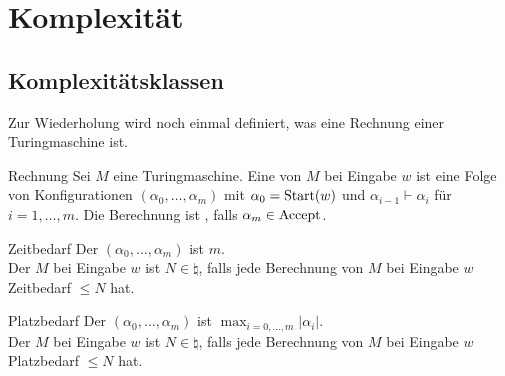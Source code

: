 \chapter{%
    Komplexität%
}

\section{%
    Komplexitätsklassen%
}

\begin{Bem}
    Zur Wiederholung wird noch einmal definiert, was eine Rechnung einer Turingmaschine ist.
\end{Bem}

\begin{Def}{Rechnung}
    Sei $M$ eine Turingmaschine.
    Eine  von $M$ bei Eingabe $w$ ist eine Folge von Konfigurationen
    $(\alpha_0, \dotsc, \alpha_m)$ mit $\alpha_0 = \text{Start}(w)$ und $\alpha_{i-1} \vdash \alpha_i$
    für $i = 1, \dotsc, m$.
    Die Berechnung ist , falls $\alpha_m \in \text{Accept}$.
\end{Def}

\begin{Def}{Zeitbedarf}
    Der  $(\alpha_0, \dotsc, \alpha_m)$ ist $m$.\\
    Der  $M$ bei Eingabe $w$ ist
    $N \in \natural$, falls jede Berechnung von $M$ bei Eingabe $w$ Zeitbedarf $\le N$ hat.
\end{Def}

\begin{Def}{Platzbedarf}
    Der  $(\alpha_0, \dotsc, \alpha_m)$ ist
    $\max_{i = 0, \dotsc, m} |\alpha_i|$.\\
    Der  $M$ bei Eingabe $w$ ist
    $N \in \natural$, falls jede Berechnung von $M$ bei Eingabe $w$ Platzbedarf $\le N$ hat.
\end{Def}

\linie

